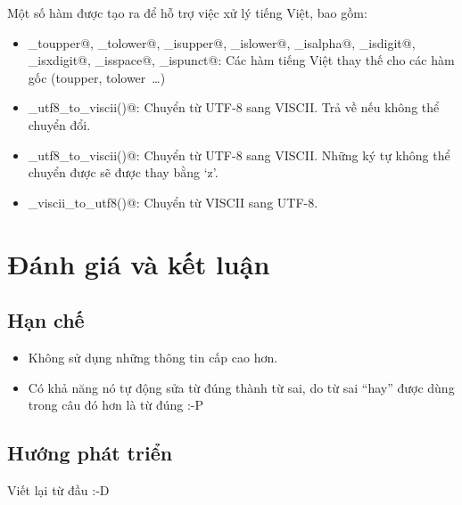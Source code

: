 \documentclass[a4paper,oneside,14pt]{extbook} %
\begin{document}
Một số hàm được tạo ra để hỗ trợ việc xử lý tiếng Việt, bao gồm:
\begin{itemize}
\item \verb@viet_toupper@, \verb@viet_tolower@, \verb@viet_isupper@, \verb@viet_islower@,
  \verb@viet_isalpha@, \verb@viet_isdigit@, \verb@viet_isxdigit@, \verb@viet_isspace@,
  \verb@viet_ispunct@: Các hàm tiếng Việt thay thế cho các hàm gốc (toupper,
  tolower~\ldots)
\item \verb@viet_utf8_to_viscii()@: Chuyển từ UTF-8 sang VISCII. Trả
  về \verb@false@ nếu không thể chuyển đổi.
\item \verb@viet_utf8_to_viscii()@: Chuyển từ UTF-8 sang VISCII. Những
  ký tự không thể chuyển được sẽ được thay bằng `z'.
\item \verb@viet_viscii_to_utf8()@: Chuyển từ VISCII sang UTF-8.
\end{itemize}



\chapter{Đánh giá và kết luận}
\label{cha:conclusion}
\minitoc

\section{Hạn chế}
\begin{itemize}
\item Không sử dụng những thông tin cấp cao hơn.
\item Có khả năng nó tự động sửa từ đúng thành từ sai, do từ sai
  ``hay'' được dùng trong câu đó hơn là từ đúng :-P
\end{itemize}

\section{Hướng phát triển}
\label{sec:todo}

Viết lại từ đầu :-D
\end{document}
